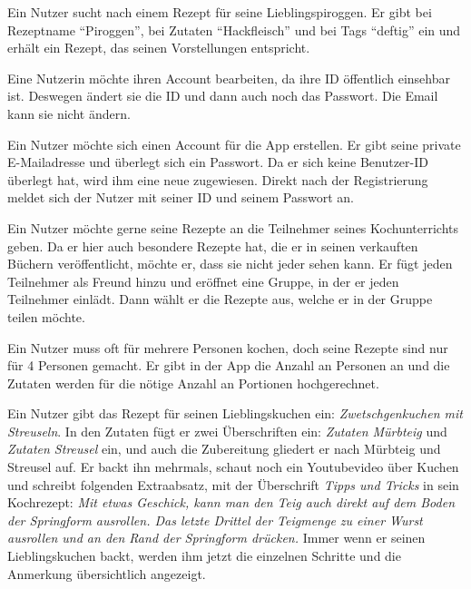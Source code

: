  Ein Nutzer sucht nach einem Rezept für seine Lieblingspiroggen. Er gibt bei Rezeptname "`Piroggen"', bei Zutaten "`Hackfleisch"' und bei \glspl{Tag} "`deftig"' ein und erhält ein Rezept, das seinen Vorstellungen entspricht.

		
 Eine Nutzerin möchte ihren Account bearbeiten, da ihre \gls{ID} öffentlich einsehbar ist. Deswegen ändert sie die \gls{ID} und dann auch noch das Passwort. Die Email kann sie nicht ändern.

Ein Nutzer möchte sich einen Account für die App erstellen. Er gibt seine private E-Mailadresse und überlegt sich ein Passwort. Da er sich keine Benutzer-ID überlegt hat, wird ihm eine neue zugewiesen. Direkt nach der Registrierung meldet sich der Nutzer mit seiner ID und seinem Passwort an.
		

 Ein Nutzer möchte gerne seine Rezepte an die Teilnehmer seines Kochunterrichts geben. Da er hier auch besondere Rezepte hat, die er in seinen verkauften Büchern veröffentlicht, möchte er, dass sie nicht jeder sehen kann. Er fügt jeden Teilnehmer als \gls{Freund} hinzu und eröffnet eine Gruppe, in der er jeden Teilnehmer einlädt. Dann wählt er die Rezepte aus, welche er in der Gruppe teilen möchte.
		
Ein Nutzer muss oft für mehrere Personen kochen, doch seine Rezepte sind nur für 4 Personen gemacht. Er gibt in der App die Anzahl an Personen an und die Zutaten werden für die nötige Anzahl an Portionen hochgerechnet.

Ein Nutzer gibt das Rezept für seinen Lieblingskuchen ein: {\em Zwetschgenkuchen mit Streuseln}. In den Zutaten fügt er zwei Überschriften ein: {\em Zutaten Mürbteig} und {\em Zutaten Streusel} ein, und auch die Zubereitung gliedert er nach Mürbteig und Streusel auf. Er backt ihn mehrmals, schaut noch ein Youtubevideo über Kuchen und schreibt folgenden Extraabsatz, mit der Überschrift {\em Tipps und Tricks} in sein Kochrezept: {\em Mit etwas Geschick, kann man den Teig auch direkt auf dem Boden der Springform ausrollen. Das letzte Drittel der Teigmenge zu einer Wurst ausrollen und an den Rand der Springform drücken.} Immer wenn er seinen Lieblingskuchen backt, werden ihm jetzt die einzelnen Schritte und die Anmerkung übersichtlich angezeigt. 
		
